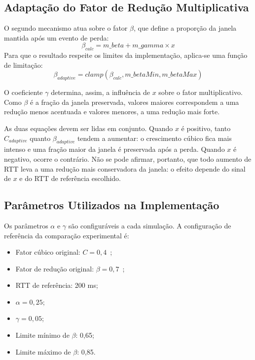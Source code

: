 \documentclass[a4paper,12pt]{monografia}
\begin{document}
\subsection{Adaptação do Fator de Redução Multiplicativa}

O segundo mecanismo atua sobre o fator $\beta$, que define a proporção da janela mantida após um evento de perda:
\begin{equation}
\beta_{calc} =
m\_beta + m\_gamma \times x
\end{equation}
Para que o resultado respeite os limites da implementação, aplica-se uma função de limitação:
\begin{equation}
\beta_{adaptive} =
clamp(\beta_{calc}, m\_betaMin, m\_betaMax)
\end{equation}

O coeficiente $\gamma$ determina, assim, a influência de $x$ sobre o fator multiplicativo. Como $\beta$ é a fração da janela preservada, valores maiores correspondem a uma redução menos acentuada e valores menores, a uma redução mais forte.

As duas equações devem ser lidas em conjunto. Quando $x$ é positivo, tanto $C_{adaptive}$ quanto $\beta_{adaptive}$ tendem a aumentar: o crescimento cúbico fica mais intenso e uma fração maior da janela é preservada após a perda. Quando $x$ é negativo, ocorre o contrário. Não se pode afirmar, portanto, que todo aumento de RTT leva a uma redução mais conservadora da janela: o efeito depende do sinal de $x$ e do RTT de referência escolhido.

\subsection{Parâmetros Utilizados na Implementação}

Os parâmetros $\alpha$ e $\gamma$ são configuráveis a cada simulação. A configuração de referência da comparação experimental é:

\begin{itemize}
    \item Fator cúbico original: $C=0{,}4$~\cite{rfc9438};
    \item Fator de redução original: $\beta=0{,}7$~\cite{rfc9438};
    \item RTT de referência: 200 ms;
    \item $\alpha=0{,}25$;
    \item $\gamma=0{,}05$;
    \item Limite mínimo de $\beta$: 0,65;
    \item Limite máximo de $\beta$: 0,85.
\end{itemize}
\end{document}
